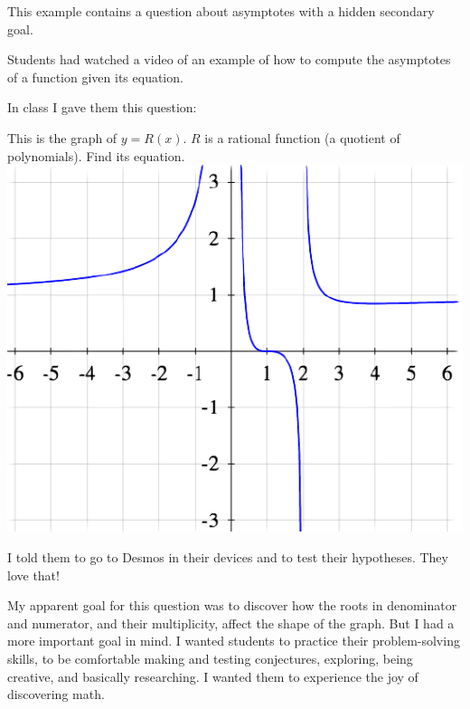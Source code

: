 \documentclass[11pt]{article}
\begin{document}
	\begin{example}
		This example contains a question about asymptotes with a hidden secondary goal.

		\begin{background}
			Students had watched a video of an example of how to compute the asymptotes
			of a function given its equation.
		\end{background}
		\begin{question}
			In class I gave them this question:
			\begin{center}
				This is the graph of $y = R(x)$. $R$ is a rational function (a quotient of
				polynomials). Find its equation.\\

				\vspace{3mm}
				\includegraphics[scale=.45]{EX4}
			\end{center}
			I told them to go to Desmos in their devices and to test their hypotheses.
			They love that!
		\end{question}
		\begin{comments}
			{\baselineskip My apparent goal for this question was to discover how the roots in denominator and numerator, and their multiplicity, affect the shape of the graph. But I had a more important goal in mind. I wanted students to practice their problem-solving skills, to be comfortable making and testing conjectures, exploring, being creative, and basically researching. I wanted them to experience the joy of discovering math.

}
\end{comments}
\end{example}
\end{document}
